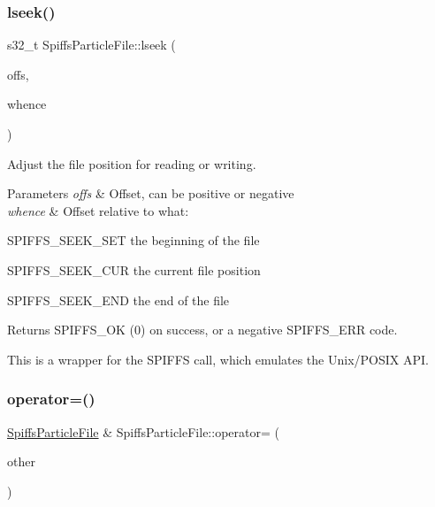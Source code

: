 \subsubsection{\texorpdfstring{lseek()}{lseek()}}
{\footnotesize\ttfamily s32\+\_\+t Spiffs\+Particle\+File\+::lseek (\begin{DoxyParamCaption}\item[{s32\+\_\+t}]{offs,  }\item[{int}]{whence }\end{DoxyParamCaption})\hspace{0.3cm}{\ttfamily [inline]}}



Adjust the file position for reading or writing. 


\begin{DoxyParams}{Parameters}
{\em offs} & Offset, can be positive or negative\\
\hline
{\em whence} & Offset relative to what\+:\\
\hline
\end{DoxyParams}

\begin{DoxyItemize}
\item S\+P\+I\+F\+F\+S\+\_\+\+S\+E\+E\+K\+\_\+\+S\+ET the beginning of the file
\item S\+P\+I\+F\+F\+S\+\_\+\+S\+E\+E\+K\+\_\+\+C\+UR the current file position
\item S\+P\+I\+F\+F\+S\+\_\+\+S\+E\+E\+K\+\_\+\+E\+ND the end of the file
\end{DoxyItemize}

\begin{DoxyReturn}{Returns}
S\+P\+I\+F\+F\+S\+\_\+\+OK (0) on success, or a negative S\+P\+I\+F\+F\+S\+\_\+\+E\+RR code.
\end{DoxyReturn}
This is a wrapper for the S\+P\+I\+F\+FS call, which emulates the Unix/\+P\+O\+S\+IX A\+PI. \mbox{\label{class_spiffs_particle_file_aa06d87b0322a764519c5d9726da7b090}} 
\subsubsection{\texorpdfstring{operator=()}{operator=()}}
{\footnotesize\ttfamily \mbox{\hyperlink{class_spiffs_particle_file}{Spiffs\+Particle\+File}} \& Spiffs\+Particle\+File\+::operator= (\begin{DoxyParamCaption}\item[{const \mbox{\hyperlink{class_spiffs_particle_file}{Spiffs\+Particle\+File}} \&}]{other }\end{DoxyParamCaption})}



